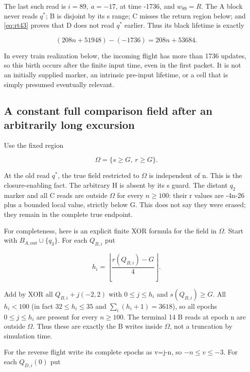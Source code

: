 The last such read is $i=89,\ a=-17$, at time -1736, and $w_{89}=R$. The A
block never reads $q^*$; B is disjoint by its s range; C misses the return
region below; and \eqref{eq:rt43} proves that D does not read $q^*$ earlier. Thus its
black lifetime is exactly

\begin{equation}\label{eq:rt44}
(208n+51948)-(-1736)=208n+53684.
\end{equation}

In every train realization below, the incoming flight has more than 1736
updates, so this birth occurs after the finite input time, even in the
first packet. It is not an initially supplied marker, an intrinsic
pre-input lifetime, or a cell that is simply presumed eventually
relevant.

\subsection{A constant full comparison field after an arbitrarily long
excursion}\label{returns-5}

Use the fixed region

\begin{equation}\label{eq:rt51}
\Omega=\{s\ge G,\ r\ge G\}.
\end{equation}

At the old read $q^*$, the true field restricted to $\Omega$ is independent of
n. This is the closure-enabling fact. The arbitrary H is absent by its s
guard. The distant $q_2$ marker and all C reads are outside $\Omega$ for every
$n\ge100$: their r values are -4n-26 plus a bounded local value,
strictly below G. This does not say they were erased; they remain in the
complete true endpoint.

For completeness, here is an explicit finite XOR formula for the field
in $\Omega$. Start with $B_{A,\mathrm{out}}\cup\{q_3\}$. For each $Q_{B,i}$ put

\[
h_i=\left\lfloor\frac{r(Q_{B,i})-G}{4}\right\rfloor.
\]

Add by XOR all $Q_{B,i}+j(-2,2)$ with $0\le j\le h_i$ and
$s(Q_{B,i})\ge G$. All $h_i<100$ (in fact $32\le h_i\le35$ and $\sum_i(h_i+1)=3618$),
so all epochs $0\le j\le h_i$ are present for every $n\ge100$. The terminal 14 B reads at epoch
n are outside $\Omega$. Thus these are exactly the B writes inside $\Omega$,
not a truncation by simulation time.

For the reverse flight write its complete epochs as v=j-n, so
$-n\le v\le-3$. For each $Q_{D,i}(0)$ put

